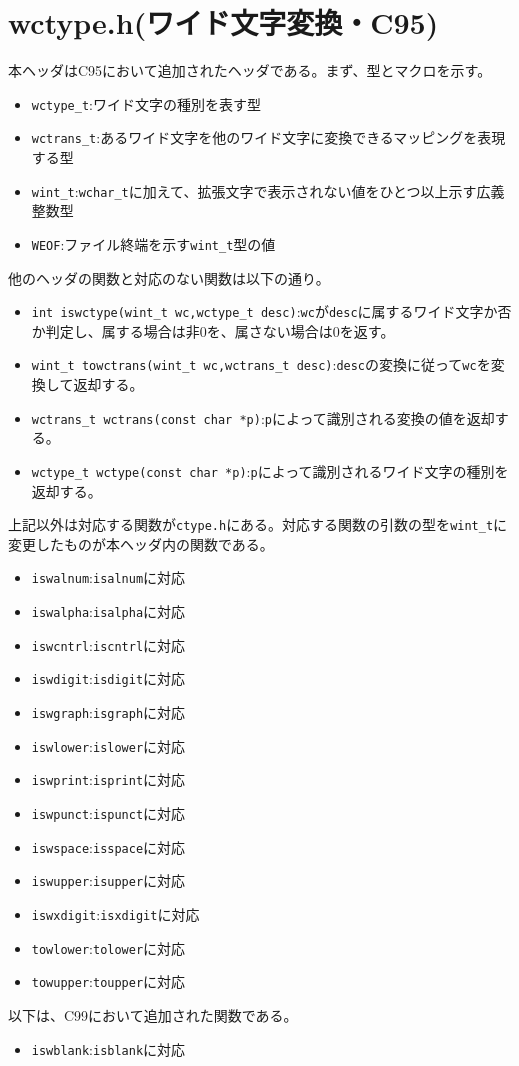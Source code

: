 \section{wctype.h(ワイド文字変換・C95)}
本ヘッダはC95において追加されたヘッダである。まず、型とマクロを示す。
\begin{itemize}
\item \verb|wctype_t|:ワイド文字の種別を表す型
\item \verb|wctrans_t|:あるワイド文字を他のワイド文字に変換できるマッピングを表現する型
\item \verb|wint_t|:\verb|wchar_t|に加えて、拡張文字で表示されない値をひとつ以上示す広義整数型
\item \verb|WEOF|:ファイル終端を示す\verb|wint_t|型の値
\end{itemize}
他のヘッダの関数と対応のない関数は以下の通り。
\begin{itemize}
\item \verb|int iswctype(wint_t wc,wctype_t desc)|:\verb|wc|が\verb|desc|に属するワイド文字か否か判定し、属する場合は非0を、属さない場合は0を返す。
\item \verb|wint_t towctrans(wint_t wc,wctrans_t desc)|:\verb|desc|の変換に従って\verb|wc|を変換して返却する。
\item \verb|wctrans_t wctrans(const char *p)|:\verb|p|によって識別される変換の値を返却する。
\item \verb|wctype_t wctype(const char *p)|:\verb|p|によって識別されるワイド文字の種別を返却する。
\end{itemize}
上記以外は対応する関数が\verb|ctype.h|にある。対応する関数の引数の型を\verb|wint_t|に変更したものが本ヘッダ内の関数である。
\begin{multicols}{2}
\begin{itemize}
\item \verb|iswalnum|:\verb|isalnum|に対応
\item \verb|iswalpha|:\verb|isalpha|に対応
\item \verb|iswcntrl|:\verb|iscntrl|に対応
\item \verb|iswdigit|:\verb|isdigit|に対応
\item \verb|iswgraph|:\verb|isgraph|に対応
\item \verb|iswlower|:\verb|islower|に対応
\item \verb|iswprint|:\verb|isprint|に対応
\item \verb|iswpunct|:\verb|ispunct|に対応
\item \verb|iswspace|:\verb|isspace|に対応
\item \verb|iswupper|:\verb|isupper|に対応
\item \verb|iswxdigit|:\verb|isxdigit|に対応
\item \verb|towlower|:\verb|tolower|に対応
\item \verb|towupper|:\verb|toupper|に対応
\end{itemize}
\end{multicols}
以下は、C99において追加された関数である。
\begin{itemize}
\item \verb|iswblank|:\verb|isblank|に対応
\end{itemize}

